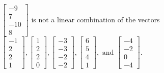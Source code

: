 \begin{exercise}
\begin{exerciseStatement}
  \end{exerciseStatement}
  \begin{exerciseAnswer}
   \(\left[\begin{array}{c}
-9 \\
7 \\
-10 \\
8
\end{array}\right]\) 
  	 is not  
	a linear combination of the vectors \(\left[\begin{array}{c}
-1 \\
2 \\
2 \\
1
\end{array}\right] , \left[\begin{array}{c}
1 \\
2 \\
2 \\
0
\end{array}\right] , \left[\begin{array}{c}
-3 \\
-3 \\
-2 \\
-2
\end{array}\right] , \left[\begin{array}{c}
6 \\
5 \\
4 \\
1
\end{array}\right] , \text{ and } \left[\begin{array}{c}
-4 \\
-2 \\
0 \\
-4
\end{array}\right]\).

	
  


  \end{exerciseAnswer}
\end{exercise}